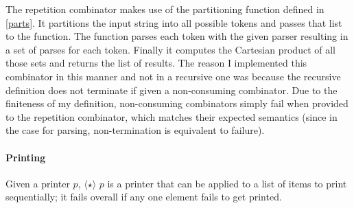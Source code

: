 \documentclass[12pt,a4paper,twoside,openright]{report}
\newcommand{\F}{\AgdaFunction}
\begin{document}
The repetition combinator makes use of the partitioning function defined in \autoref{parts}. It partitions the input string into all possible tokens and passes that list to the \F{parseList} function. The \F{parseList} function parses each token with the given parser resulting in a set of parses for each token. Finally it computes the Cartesian product of all those sets and returns the list of results. The reason I implemented this combinator in this manner and not in a recursive one was because the recursive definition does not terminate if given a non-consuming combinator. Due to the finiteness of my definition, non-consuming combinators simply fail when provided to the repetition combinator, which matches their expected semantics (since in the case for parsing, non-termination is equivalent to failure).



\paragraph{Printing}
{Given a printer $p$, {$\langle\star\rangle$ $p$} is a printer that can be applied to a list of items to print sequentially; it fails overall if any one element fails to get printed}.

\begin{code}
\> \AgdaSymbol{:} \AgdaSymbol{\{} \AgdaSymbol{:} \AgdaSymbol{\}}      \AgdaSymbol{(} \AgdaSymbol{)}\<%
\\
\>[4] \AgdaSymbol{(} \AgdaSymbol{)} \AgdaSymbol{=}      \AgdaSymbol{(} \AgdaFunction{\_++\_}\AgdaSymbol{)} \AgdaSymbol{(} \AgdaInductiveConstructor{[]}\AgdaSymbol{)} \AgdaSymbol{(}  \AgdaSymbol{))}\<%
\end{code}
\end{document}
